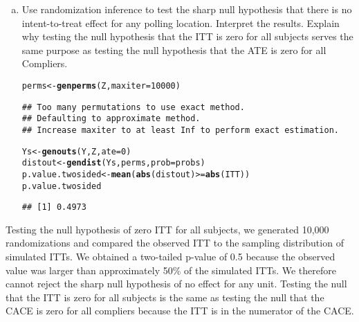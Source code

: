 \documentclass[11pt,notitlepage]{article}\usepackage[]{graphicx}\usepackage[]{color}
\makeatletter
\newcommand{\hlnum}[1]{\textcolor[rgb]{0.686,0.059,0.569}{#1}}%
\newcommand{\hlopt}[1]{\textcolor[rgb]{0,0,0}{#1}}%
\newcommand{\hlstd}[1]{\textcolor[rgb]{0.345,0.345,0.345}{#1}}%
\newcommand{\hlkwb}[1]{\textcolor[rgb]{0.69,0.353,0.396}{#1}}%
\newcommand{\hlkwc}[1]{\textcolor[rgb]{0.333,0.667,0.333}{#1}}%
\newcommand{\hlkwd}[1]{\textcolor[rgb]{0.737,0.353,0.396}{\textbf{#1}}}%
\newenvironment{kframe}{%
 \def\at@end@of@kframe{}%
 \ifinner\ifhmode%
  \def\at@end@of@kframe{\end{minipage}}%
  \begin{minipage}{\columnwidth}%
 \fi\fi%
 \def\FrameCommand##1{\hskip\@totalleftmargin \hskip-\fboxsep
 \colorbox{shadecolor}{##1}\hskip-\fboxsep
     \hskip-\linewidth \hskip-\@totalleftmargin \hskip\columnwidth}%
 \MakeFramed {\advance\hsize-\width
   \@totalleftmargin\z@ \linewidth\hsize
   \@setminipage}}%
 {\par\unskip\endMakeFramed%
 \at@end@of@kframe}
\newenvironment{knitrout}{}{} %
\makeatother
\begin{document}
\begin{enumerate}[a)]
\item Use randomization inference to test the sharp null hypothesis that there is no intent-to-treat effect for any polling location. Interpret the results. Explain why testing the null hypothesis that the ITT is zero for all subjects serves the same purpose as testing the null hypothesis that the ATE is zero for all Compliers.

\begin{knitrout}
\color{fgcolor}\begin{kframe}
\begin{alltt}
\hlstd{perms} \hlkwb{<-} \hlkwd{genperms}\hlstd{(Z,}\hlkwc{maxiter}\hlstd{=}\hlnum{10000}\hlstd{)}
\end{alltt}
\begin{verbatim}
## Too many permutations to use exact method.
## Defaulting to approximate method.
## Increase maxiter to at least Inf to perform exact estimation.
\end{verbatim}
\begin{alltt}
\hlstd{Ys} \hlkwb{<-} \hlkwd{genouts}\hlstd{(Y,Z,}\hlkwc{ate}\hlstd{=}\hlnum{0}\hlstd{)}
\hlstd{distout} \hlkwb{<-} \hlkwd{gendist}\hlstd{(Ys,perms,}\hlkwc{prob}\hlstd{=probs)}
\hlstd{p.value.twosided} \hlkwb{<-} \hlkwd{mean}\hlstd{(}\hlkwd{abs}\hlstd{(distout)} \hlopt{>=} \hlkwd{abs}\hlstd{(ITT))}
\hlstd{p.value.twosided}
\end{alltt}
\begin{verbatim}
## [1] 0.4973
\end{verbatim}
\end{kframe}
\end{knitrout}
\end{enumerate}

Testing the null hypothesis of zero ITT for all subjects, we generated 10,000 randomizations and compared the observed ITT to the sampling distribution of simulated ITTs. We obtained a two-tailed p-value of 0.5 because the observed value was larger than approximately 50\% of the simulated ITTs. We therefore cannot reject the sharp null hypothesis of no effect for any unit. Testing the null that the ITT is zero for all subjects is the same as testing the null that the CACE is zero for all compliers because the ITT is in the numerator of the CACE. 
\end{document}
